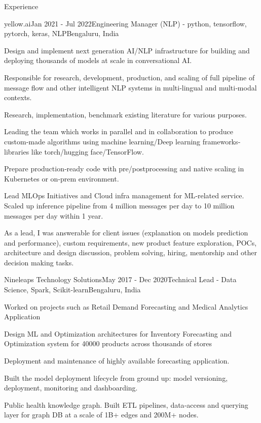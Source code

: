 \documentclass{resume}
\begin{document}
\begin{rSection}{Experience}
    \begin{rSubsection}{yellow.ai}{Jan 2021 - Jul 2022}{Engineering Manager (NLP) - python, tensorflow, pytorch, keras, NLP}{Bengaluru, India}
    \item Design and implement next generation AI/NLP infrastructure for building and deploying thousands of models at scale in conversational AI.
    \item Responsible for research, development, production, and scaling of full pipeline of message flow and other intelligent NLP systems in multi‐lingual and multi‐modal contexts.
    \item Research, implementation, benchmark existing literature for various purposes.
    \item Leading the team which works in parallel and in collaboration to produce custom‐made algorithms using machine learning/Deep learning frameworks‐libraries like torch/hugging face/TensorFlow.
    \item Prepare production‐ready code with pre/postprocessing and native scaling in Kubernetes or on‐prem environment.
    \item Lead MLOps Initiatives and Cloud infra management for ML‐related service. Scaled up inference pipeline from 4 million messages per day to 10 million messages per day within 1 year.
    \item As a lead, I was answerable for client issues (explanation on models prediction and performance), custom requirements, new product feature exploration, POCs, architecture and design discussion, problem solving, hiring, mentorship and other decision making tasks.
    \end{rSubsection}
  
    \begin{rSubsection}{Nineleaps Technology Solutions}{May 2017 - Dec 2020}{Technical Lead - Data Science, Spark, Scikit-learn}{Bengaluru, India}
    \item Worked on projects such as Retail Demand Forecasting and Medical Analytics Application
    \item Design ML and Optimization architectures for Inventory Forecasting and Optimization system for 40000 products across thousands of stores
    \item Deployment and maintenance of highly available forecasting application.
    \item Built the model deployment lifecycle from ground up: model versioning, deployment, monitoring and dashboarding.
    \item Public health knowledge graph. Built ETL pipelines, data‐access and querying layer for graph DB at a scale of 1B+ edges and 200M+ nodes.
    \end{rSubsection}


\end{rSection}
\end{document}
